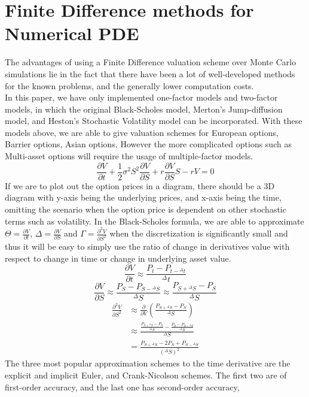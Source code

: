\section{Finite Difference methods for Numerical PDE}
The advantages of using a Finite Difference valuation scheme over Monte Carlo simulations lie in the fact that there have been a lot of well-developed methods for the known problems, and the generally lower computation costs.\\[3mm]
In this paper, we have only implemented one-factor models and two-factor models, in which the original Black-Scholes model, Merton's Jump-diffusion model, and Heston's Stochastic Volatility model can be incorporated. With these models above, we are able to give valuation schemes for European options, Barrier options, Asian options. However the more complicated options such as Multi-asset options will require the usage of multiple-factor models.
$$\frac{\partial V}{\partial t}+\frac{1}{2}\sigma^{2}S^{2}\frac{\partial V}{\partial S}+r\frac{\partial V}{\partial S}S- rV = 0$$
If we are to plot out the option prices in a diagram, there should be a 3D diagram with y-axis being the underlying prices, and x-axis being the time, omitting the scenario when the option price is dependent on other stochastic terms such as volatility.
In the Black-Scholes formula, we are able to approximate $\Theta = \frac{\partial V}{\partial t}$, $\Delta = \frac{\partial V}{\partial S}$ and $\Gamma = \frac{\partial^{2} V}{\partial S^{2}}$ when the discretization is significantly small and thus it will be easy to simply use the ratio of change in derivatives value with respect to change in time or change in underlying asset value.\\
$$\frac{\partial V}{\partial t} \approx \frac{P_{t} - P_{t-{^{\Delta}t}}}{^{\Delta}t}$$
$$\frac{\partial V}{\partial S} \approx \frac{P_{S} - P_{S-{^{\Delta}S}}}{^{\Delta}S} \approx \frac{P_{S+{^{\Delta}S}} - P_{S}}{^{\Delta}S}$$
\begin{equation*}
\begin{split}
\frac{\partial^{2} V}{\partial S^{2}}
&\approx \frac{\partial}{\partial V}(\frac{P_{S+{^{\Delta}S}} - P_{S}}{^{\Delta}S})\\
&\approx \frac{\frac{P_{S+{^{\Delta}S}} - P_{S}}{^{\Delta}S} - \frac{P_{S} - P_{S-{^{\Delta}S}}}{^{\Delta}S}}{^{\Delta}S}\\
&= \frac{P_{S+{^{\Delta}S}} - 2P_{S} + P_{S-{^{\Delta}S}}}{(^{\Delta}S)^{2}}
\end{split}
\end{equation*}
The three most popular approximation schemes to the time derivative are the explicit and implicit Euler, and Crank-Nicolson schemes. The first two are of first-order accuracy, and the last one has second-order accuracy\cite{FiniteDifference},
\newpage

